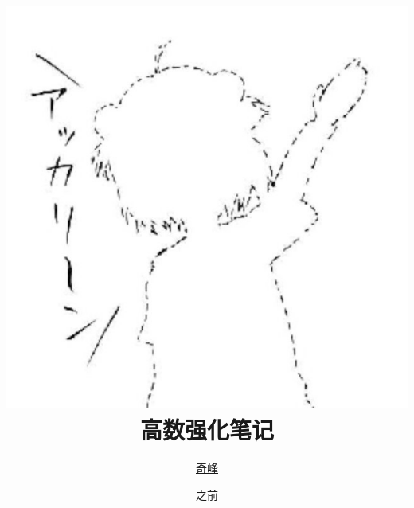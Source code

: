 \documentclass[oneside]{ctexbook}
\title{\includegraphics[scale=0.6]{1.jpg}\\ \textsf{高数强化笔记}}
\author{\href{https://qifengggg.github.io/}{奇峰}}
\date{之前}
\begin{document}
\theoremseparator{}
\newtheorem{def1}{定义}[section]
\newtheorem{theo1}{定理}[section]
\newtheorem{func1}{方法}[section]
\newtheorem{infer1}{推论}[section]
\newenvironment{proof}{\begin{itemize}\item \textbf{证明}
	
	}{\end{itemize}}


\newenvironment{Def}[1][\quad{}]{\begin{def1}\textbf{#1}}{\end{def1}}
\newenvironment{Theo}[1][\quad{}]{\begin{theo1}\textbf{#1}}{\end{theo1}}
\newenvironment{Func}[1][\quad{}]{\begin{func1}\textbf{#1}}{\end{func1}}
\newenvironment{Infer}[1][\quad{}]{\begin{infer1}\textbf{#1}}{\end{infer1}}
\newenvironment{Field}[1][\quad{}]{\noindent\newline\textbf{#1}}{}

\setlength{\parskip}{3pt}

\newcommand{\from}[1]{\hypertarget{#1}{}}
\newcommand{\goto}[1]{\quad{}\hyperlink{#1}{$ \diamondsuit $ }\hypertarget{K#1}{}}

\newcommand{\getback}[1]{\quad{}\hyperlink{K#1}{$ \blacksquare $ }}
\newcommand{\qline}{\underline{~~~~~~~~}}

\frontmatter
\maketitle
\hypertarget{Index}{}
\tableofcontents

\mainmatter








\end{document}
